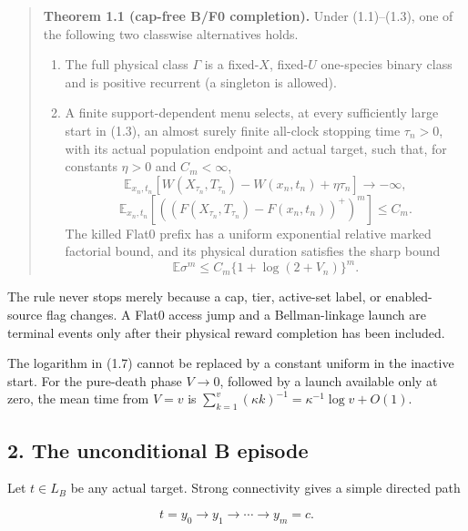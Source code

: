 \begin{quote}
\textbf{Theorem 1.1 (cap-free B/F0 completion).} Under (1.1)--(1.3), one
of the following two classwise alternatives holds.

\begin{enumerate}
\def\labelenumi{\arabic{enumi}.}
\tightlist
\item
  The full physical class \(\Gamma\) is a fixed-\(X\), fixed-\(U\)
  one-species binary class and is positive recurrent (a singleton is
  allowed).
\item
  A finite support-dependent menu selects, at every sufficiently large
  start in (1.3), an almost surely finite all-clock stopping time
  \(\tau_n>0\), with its actual population endpoint and actual target,
  such that, for constants \(\eta>0\) and \(C_m<\infty\), \[
  \mathbb E_{x_n,t_n}
     [W(X_{\tau_n},T_{\tau_n})-W(x_n,t_n)+\eta\tau_n]
        \longrightarrow-\infty,                    \tag{1.5}
  \] \[
  \mathbb E_{x_n,t_n}
     [((F(X_{\tau_n},T_{\tau_n})-F(x_n,t_n))^+)^m]
        \le C_m.                                    \tag{1.6}
  \] The killed Flat0 prefix has a uniform exponential relative marked
  factorial bound, and its physical duration satisfies the sharp bound
  \[
     \mathbb E\sigma^m\le
        C_m\{1+\log(2+V_n)\}^m.                    \tag{1.7}
  \]
\end{enumerate}
\end{quote}

The rule never stops merely because a cap, tier, active-set label, or
enabled-source flag changes. A Flat0 access jump and a Bellman-linkage
launch are terminal events only after their physical reward completion
has been included.

The logarithm in (1.7) cannot be replaced by a constant uniform in the
inactive start. For the pure-death phase \(V\to0\), followed by a launch
available only at zero, the mean time from \(V=v\) is
\(\sum_{k=1}^v(\kappa k)^{-1}=\kappa^{-1}\log v+O(1)\).

\subsection{2. The unconditional B
episode}

Let \(t\in L_B\) be any actual target. Strong connectivity gives a
simple directed path

\[
       t=y_0\longrightarrow y_1\longrightarrow\cdots
                         \longrightarrow y_m=c.       \tag{2.1}
\]

